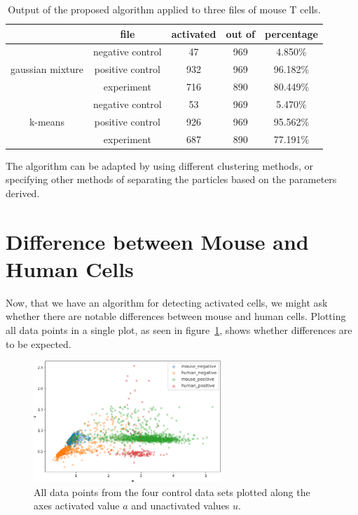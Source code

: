\begin{table}[h]
	\centering
	\begin{tabular}{|c|c|c|c|c|}
		\hline
		 & \textbf{file} & \textbf{activated} & \textbf{out of} & \textbf{percentage}\\
		 \hline
		 \hline
		  & negative control & 47 & 969 & 4.850\%\\
		 gaussian mixture & positive control & 932 & 969 & 96.182\%\\
		  & experiment & 716 & 890 & 80.449\%\\
		 \hline
		  & negative control & 53 & 969 & 5.470\%\\
		 k-means & positive control & 926 & 969 & 95.562\%\\
		  & experiment & 687 & 890 & 77.191\%\\
		 \hline
	\end{tabular}
	\caption{Output of the proposed algorithm applied to three files of mouse T cells.}
	\label{tab:results_main_algorithm}
\end{table}

The algorithm can be adapted by using different clustering methods, or specifying other methods of separating the particles based on the parameters derived.

\section{Difference between Mouse and Human Cells}
\label{sec:differences_between_mouse_and_human_cells}

Now, that we have an algorithm for detecting activated cells, we might ask whether there are notable differences between mouse and human cells. Plotting all data points in a single plot, as seen in figure~\ref{fig:all_cells}, shows whether differences are to be expected.

\begin{figure}[h!]
	\centering
	\includegraphics[width=0.63\textwidth]{fig/all_cells}
	
	\caption{All data points from the four control data sets plotted along the axes activated value $a$ and unactivated values $u$.}
	\label{fig:all_cells}
\end{figure}
\newpage

